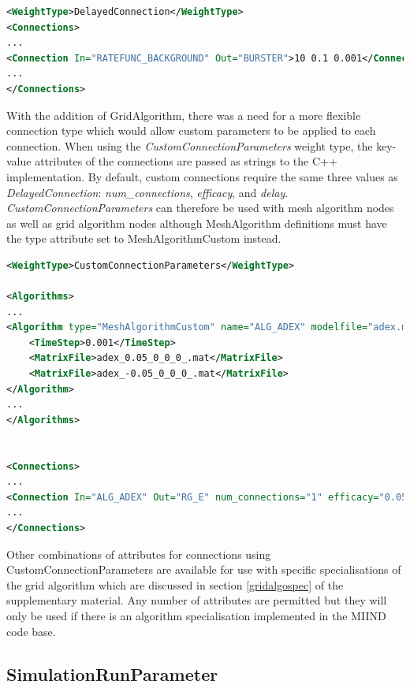 \documentclass[utf8]{frontiersSCNS} %
\begin{document}
\begin{lstlisting}[language=xml,caption={A DelayedConnection with number of connections = 10, efficacy = 0.1, and delay of 1ms.}]
<WeightType>DelayedConnection</WeightType>
<Connections>
...
<Connection In="RATEFUNC_BACKGROUND" Out="BURSTER">10 0.1 0.001</Connection>
...
</Connections>
\end{lstlisting}

With the addition of GridAlgorithm, there was a need for a more flexible connection type which would allow custom parameters to be applied to each connection. When using the \textit{CustomConnectionParameters} weight type, the key-value attributes of the connections are passed as strings to the C++ implementation. By default, custom connections require the same three values as \textit{DelayedConnection}: \textit{num\_connections}, \textit{efficacy}, and \textit{delay}. \textit{CustomConnectionParameters} can therefore be used with mesh algorithm nodes as well as grid algorithm nodes although MeshAlgorithm definitions must have the type attribute set to MeshAlgorithmCustom instead.

\begin{lstlisting}[language=xml,caption={A MeshAlgorithmCustom definition for use with WeightType=CustomConnectionParameters and a Connection using the num\_connections, efficacy, and delay attributes.}]
<WeightType>CustomConnectionParameters</WeightType>

<Algorithms>
...
<Algorithm type="MeshAlgorithmCustom" name="ALG_ADEX" modelfile="adex.model" >
	<TimeStep>0.001</TimeStep>
	<MatrixFile>adex_0.05_0_0_0_.mat</MatrixFile>
	<MatrixFile>adex_-0.05_0_0_0_.mat</MatrixFile>
</Algorithm>
...
</Algorithms>


<Connections>
...
<Connection In="ALG_ADEX" Out="RG_E" num_connections="1" efficacy="0.05" delay="0.0"/>
...
</Connections>
\end{lstlisting}

Other combinations of attributes for connections using CustomConnectionParameters are available for use with specific specialisations of the grid algorithm which are discussed in section \ref{gridalgospec} of the supplementary material. Any number of attributes are permitted but they will only be used if there is an algorithm specialisation implemented in the MIIND code base.\\

\subsection{SimulationRunParameter}
\end{document}
